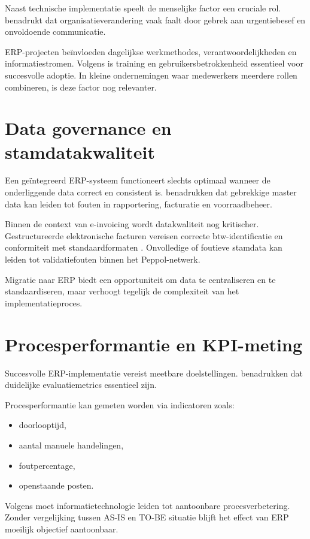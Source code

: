 Naast technische implementatie speelt de menselijke factor een cruciale rol. \textcite{Kotter1996} benadrukt dat organisatieverandering vaak faalt door gebrek aan urgentiebesef en onvoldoende communicatie.

ERP-projecten beïnvloeden dagelijkse werkmethodes, verantwoordelijkheden en informatiestromen. Volgens \textcite{Nah2001} is training en gebruikersbetrokkenheid essentieel voor succesvolle adoptie. In kleine ondernemingen waar medewerkers meerdere rollen combineren, is deze factor nog relevanter.

\section{Data governance en stamdatakwaliteit}

Een geïntegreerd ERP-systeem functioneert slechts optimaal wanneer de onderliggende data correct en consistent is. \textcite{Umble2003} benadrukken dat gebrekkige master data kan leiden tot fouten in rapportering, facturatie en voorraadbeheer.

Binnen de context van e-invoicing wordt datakwaliteit nog kritischer. Gestructureerde elektronische facturen vereisen correcte btw-identificatie en conformiteit met standaardformaten \autocite{EuropeanCommission_2025}. Onvolledige of foutieve stamdata kan leiden tot validatiefouten binnen het Peppol-netwerk.

Migratie naar ERP biedt een opportuniteit om data te centraliseren en te standaardiseren, maar verhoogt tegelijk de complexiteit van het implementatieproces.

\section{Procesperformantie en KPI-meting}

Succesvolle ERP-implementatie vereist meetbare doelstellingen. \textcite{Nah2001} benadrukken dat duidelijke evaluatiemetrics essentieel zijn.

Procesperformantie kan gemeten worden via indicatoren zoals:
\begin{itemize}
    \item doorlooptijd,
    \item aantal manuele handelingen,
    \item foutpercentage,
    \item openstaande posten.
\end{itemize}

Volgens \textcite{Davenport1990} moet informatietechnologie leiden tot aantoonbare procesverbetering. Zonder vergelijking tussen AS-IS en TO-BE situatie blijft het effect van ERP moeilijk objectief aantoonbaar.

